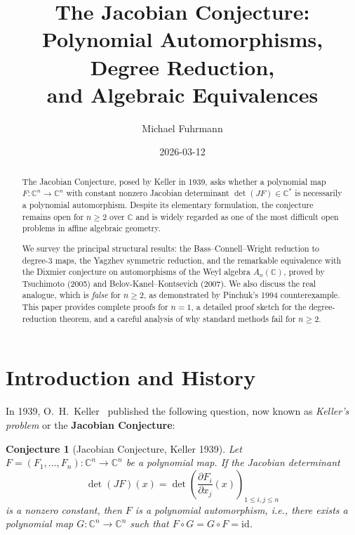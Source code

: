 \documentclass[12pt,a4paper]{amsart}
\newtheorem{conjecture}[theorem]{Conjecture}
\theoremstyle{definition}
\theoremstyle{remark}
\begin{document}
\title{The Jacobian Conjecture:\\
Polynomial Automorphisms, Degree Reduction,\\
and Algebraic Equivalences}

\author{Michael Fuhrmann}
\address{Specialist Mathematics Project, Build 166}
\date{2026-03-12}

\begin{abstract}
The Jacobian Conjecture, posed by Keller in 1939, asks whether a polynomial
map $F \colon \mathbb{C}^n \to \mathbb{C}^n$ with constant nonzero Jacobian
determinant $\det(JF) \in \mathbb{C}^*$ is necessarily a polynomial automorphism.
Despite its elementary formulation, the conjecture remains open for $n \geq 2$
over $\mathbb{C}$ and is widely regarded as one of the most difficult open problems
in affine algebraic geometry.

We survey the principal structural results: the Bass--Connell--Wright reduction
to degree-$3$ maps, the Yagzhev symmetric reduction, and the remarkable
equivalence with the Dixmier conjecture on automorphisms of the Weyl algebra
$A_n(\mathbb{C})$, proved by Tsuchimoto (2005) and Belov-Kanel--Kontsevich (2007).
We also discuss the real analogue, which is \emph{false} for $n \geq 2$, as
demonstrated by Pinchuk's 1994 counterexample.
This paper provides complete proofs for $n=1$, a detailed proof sketch for the
degree-reduction theorem, and a careful analysis of why standard methods fail
for $n \geq 2$.
\end{abstract}

\maketitle

\tableofcontents

\section{Introduction and History}

In 1939, O.~H.\ Keller~\cite{Keller1939} published the following question, now
known as \emph{Keller's problem} or the \textbf{Jacobian Conjecture}:

\begin{conjecture}[Jacobian Conjecture, Keller 1939]\label{conj:JC}
Let $F = (F_1,\ldots,F_n) \colon \mathbb{C}^n \to \mathbb{C}^n$ be a polynomial map.
If the Jacobian determinant
\[
  \det(JF)(x) = \det\!\left(\frac{\partial F_i}{\partial x_j}(x)\right)_{1\leq i,j\leq n}
\]
is a nonzero constant, then $F$ is a polynomial automorphism, i.e., there exists
a polynomial map $G \colon \mathbb{C}^n \to \mathbb{C}^n$ such that $F \circ G = G \circ F = \mathrm{id}$.
\end{conjecture}
\end{document}
